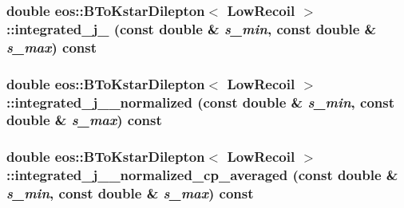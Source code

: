 \hypertarget{classeos_1_1BToKstarDilepton_3_01LowRecoil_01_4_ac5480bfbfb3883f97567564100ed6ac4}{
\subsubsection[{integrated\_\-j\_\-3}]{\setlength{\rightskip}{0pt plus 5cm}double eos::BToKstarDilepton$<$ {\bf LowRecoil} $>$::integrated\_\-j\_ (const double \& {\em s\_\-min}, \/  const double \& {\em s\_\-max}) const}}
\label{classeos_1_1BToKstarDilepton_3_01LowRecoil_01_4_ac5480bfbfb3883f97567564100ed6ac4}
\hypertarget{classeos_1_1BToKstarDilepton_3_01LowRecoil_01_4_ae8c6009d0de2040febb7fadaf6d364c2}{
\subsubsection[{integrated\_\-j\_\-3\_\-normalized}]{\setlength{\rightskip}{0pt plus 5cm}double eos::BToKstarDilepton$<$ {\bf LowRecoil} $>$::integrated\_\-j\_\_\-normalized (const double \& {\em s\_\-min}, \/  const double \& {\em s\_\-max}) const}}
\label{classeos_1_1BToKstarDilepton_3_01LowRecoil_01_4_ae8c6009d0de2040febb7fadaf6d364c2}
\hypertarget{classeos_1_1BToKstarDilepton_3_01LowRecoil_01_4_a042d95c0b797000c2214bb41a7253d4d}{
\subsubsection[{integrated\_\-j\_\-3\_\-normalized\_\-cp\_\-averaged}]{\setlength{\rightskip}{0pt plus 5cm}double eos::BToKstarDilepton$<$ {\bf LowRecoil} $>$::integrated\_\-j\_\_\-normalized\_\-cp\_\-averaged (const double \& {\em s\_\-min}, \/  const double \& {\em s\_\-max}) const}}
